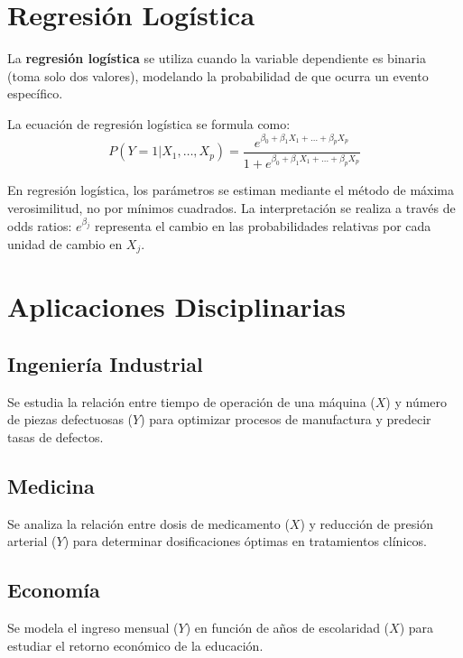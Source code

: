 \section{Regresión Logística}

\begin{definition}
La \textbf{regresión logística} se utiliza cuando la variable dependiente es binaria (toma solo dos valores), modelando la probabilidad de que ocurra un evento específico.
\end{definition}

La ecuación de regresión logística se formula como:
$$P(Y=1|X_1, \ldots, X_p) = \frac{e^{\beta_0 + \beta_1 X_1 + \ldots + \beta_p X_p}}{1 + e^{\beta_0 + \beta_1 X_1 + \ldots + \beta_p X_p}}$$

\begin{remark}
En regresión logística, los parámetros se estiman mediante el método de máxima verosimilitud, no por mínimos cuadrados. La interpretación se realiza a través de odds ratios: $e^{\beta_j}$ representa el cambio en las probabilidades relativas por cada unidad de cambio en $X_j$.
\end{remark}

\section{Aplicaciones Disciplinarias}

\subsection{Ingeniería Industrial}
\begin{example}
Se estudia la relación entre tiempo de operación de una máquina ($X$) y número de piezas defectuosas ($Y$) para optimizar procesos de manufactura y predecir tasas de defectos.
\end{example}

\subsection{Medicina}
\begin{example}
Se analiza la relación entre dosis de medicamento ($X$) y reducción de presión arterial ($Y$) para determinar dosificaciones óptimas en tratamientos clínicos.
\end{example}

\subsection{Economía}
\begin{example}
Se modela el ingreso mensual ($Y$) en función de años de escolaridad ($X$) para estudiar el retorno económico de la educación.
\end{example}

